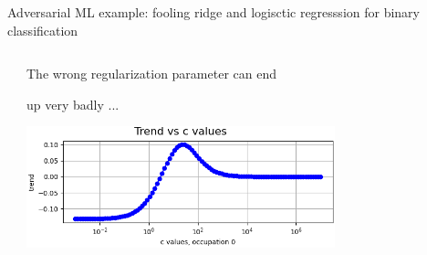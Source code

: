 \begin{frame}{Adversarial ML example: fooling ridge and logisctic regresssion for binary classification}
  \begin{columns}[T] %
    \begin{column}{.3\textwidth}

      \begin{center}
      \end{center}

    \end{column}%
    \begin{column}{.7\textwidth}
      \hspace{0.2\textwidth}The wrong regularization parameter can end

      \hspace{0.2\textwidth}up very badly ...
      \begin{center}

        \includegraphics[width=0.7\textwidth]{graphics/data-from-counts-simpson-154}

        \end{center}
    \end{column}%
\end{columns}
\end{frame}


